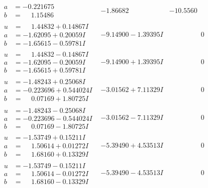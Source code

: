 \documentclass[1p]{elsarticle_modified}
\theoremstyle{definition}
\begin{document}
$$\begin{array}{c|c|c}
\begin{aligned}
a &= -0.221675\phantom{ +0.000000I} \\
b &= \phantom{-}1.15486\phantom{ +0.000000I}\end{aligned}
 & -1.86682\phantom{ +0.000000I} & -10.5560\phantom{ +0.000000I} \\ \hline\begin{aligned}
u &= \phantom{-}1.44832 + 0.14867 I \\
a &= -1.62095 + 0.20059 I \\
b &= -1.65615 - 0.59781 I\end{aligned}
 & -9.14900 - 1.39395 I & \phantom{-0.000000 } 0 \\ \hline\begin{aligned}
u &= \phantom{-}1.44832 - 0.14867 I \\
a &= -1.62095 - 0.20059 I \\
b &= -1.65615 + 0.59781 I\end{aligned}
 & -9.14900 + 1.39395 I & \phantom{-0.000000 } 0 \\ \hline\begin{aligned}
u &= -1.48243 + 0.25068 I \\
a &= -0.223696 + 0.544024 I \\
b &= \phantom{-}0.07169 + 1.80725 I\end{aligned}
 & -3.01562 + 7.11329 I & \phantom{-0.000000 } 0 \\ \hline\begin{aligned}
u &= -1.48243 - 0.25068 I \\
a &= -0.223696 - 0.544024 I \\
b &= \phantom{-}0.07169 - 1.80725 I\end{aligned}
 & -3.01562 - 7.11329 I & \phantom{-0.000000 } 0 \\ \hline\begin{aligned}
u &= -1.53749 + 0.15211 I \\
a &= \phantom{-}1.50614 + 0.01272 I \\
b &= \phantom{-}1.68160 + 0.13329 I\end{aligned}
 & -5.39490 + 4.53513 I & \phantom{-0.000000 } 0 \\ \hline\begin{aligned}
u &= -1.53749 - 0.15211 I \\
a &= \phantom{-}1.50614 - 0.01272 I \\
b &= \phantom{-}1.68160 - 0.13329 I\end{aligned}
 & -5.39490 - 4.53513 I & \phantom{-0.000000 } 0 \\ \hline\begin{aligned}

\end{aligned}
\end{array}$$
\end{document}
